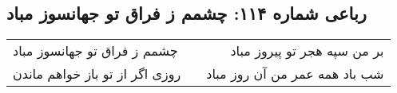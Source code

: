 \begin{center}
\section*{رباعی شماره ۱۱۴: چشمم ز فراق تو جهانسوز مباد}
\label{sec:sh114}
\begin{longtable}{l p{0.5cm} r}
چشمم ز فراق تو جهانسوز مباد
&&
بر من سپه هجر تو پیروز مباد
\\
روزی اگر از تو باز خواهم ماندن
&&
شب باد همه عمر من آن روز مباد
\\
\end{longtable}
\end{center}
